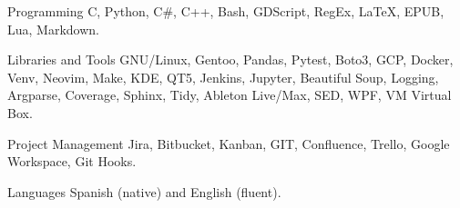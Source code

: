 

\begin{cvskills}

  \cvskill
    {Programming} %
    {C, Python, C\#, C++, Bash, GDScript, RegEx, LaTeX, EPUB, Lua, Markdown.} %

  \cvskill
    {Libraries and Tools}
    {GNU/Linux, Gentoo, Pandas, Pytest, Boto3, GCP, Docker, Venv, Neovim, Make, KDE, QT5, Jenkins, Jupyter,}
  \cvskill
    {}
    {Beautiful Soup, Logging, Argparse, Coverage, Sphinx, Tidy, Ableton Live/Max, SED, WPF, VM Virtual Box.}

  \cvskill
    {Project Management}
    {Jira, Bitbucket, Kanban, GIT, Confluence, Trello, Google Workspace, Git Hooks.}

  \cvskill
    {Languages}
    {Spanish (native) and English (fluent).}


\end{cvskills}
